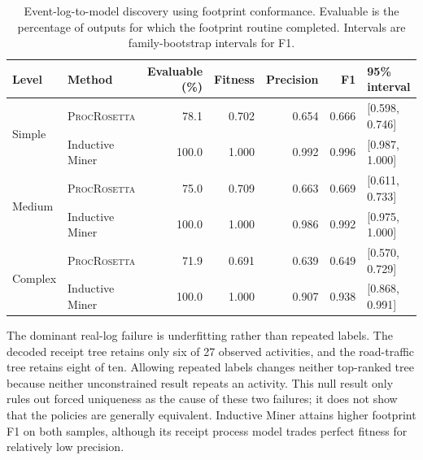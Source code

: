 \documentclass[pdflatex,sn-basic]{sn-jnl}
\newcommand{\model}{\textsc{ProcRosetta}\xspace}
\begin{document}
\begin{table}[!t]
\centering
\caption{Event-log-to-model discovery using footprint conformance. Evaluable is the percentage of outputs for which the footprint routine completed. Intervals are family-bootstrap intervals for F1.}
\label{tab:discovery}
\setlength{\tabcolsep}{4pt}
\begin{tabular}{@{}llrrrrl@{}}
\toprule
Level & Method & Evaluable (\%) & Fitness & Precision & F1 & 95\% interval \\
\midrule
\multirow{2}{*}{Simple}
 & \model{} & 78.1 & 0.702 & 0.654 & 0.666 & [0.598, 0.746] \\
 & Inductive Miner & 100.0 & 1.000 & 0.992 & 0.996 & [0.987, 1.000] \\
\midrule
\multirow{2}{*}{Medium}
 & \model{} & 75.0 & 0.709 & 0.663 & 0.669 & [0.611, 0.733] \\
 & Inductive Miner & 100.0 & 1.000 & 0.986 & 0.992 & [0.975, 1.000] \\
\midrule
\multirow{2}{*}{Complex}
 & \model{} & 71.9 & 0.691 & 0.639 & 0.649 & [0.570, 0.729] \\
 & Inductive Miner & 100.0 & 1.000 & 0.907 & 0.938 & [0.868, 0.991] \\
\bottomrule
\end{tabular}
\end{table}

The dominant real-log failure is underfitting rather than repeated labels. The decoded receipt tree retains only six of 27 observed activities, and the road-traffic tree retains eight of ten. Allowing repeated labels changes neither top-ranked tree because neither unconstrained result repeats an activity. This null result only rules out forced uniqueness as the cause of these two failures; it does not show that the policies are generally equivalent. Inductive Miner attains higher footprint F1 on both samples, although its receipt process model trades perfect fitness for relatively low precision.
\end{document}
